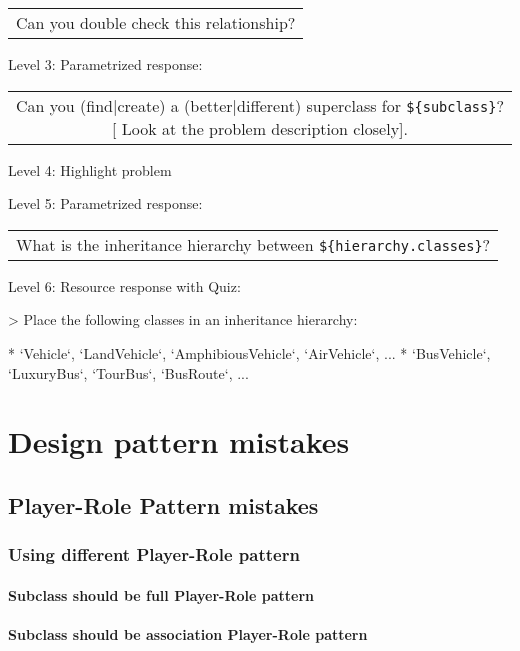 \begin{tabular}{|c}
Can you double check this relationship?
\end{tabular} \medskip

\noindent Level 3: Parametrized response: \medskip

\begin{tabular}{|c}
Can you (find|create) a (better|different) superclass for \verb|${subclass}|?[ Look at the problem description closely].
\end{tabular} \medskip

\noindent Level 4: Highlight problem \medskip

\noindent Level 5: Parametrized response: \medskip

\begin{tabular}{|c}
What is the inheritance hierarchy between \verb|${hierarchy.classes}|?
\end{tabular} \medskip

\noindent Level 6: Resource response with Quiz:

> Place the following classes in an inheritance hierarchy:

* `Vehicle`, `LandVehicle`, `AmphibiousVehicle`, `AirVehicle`, ...
* `BusVehicle`, `LuxuryBus`, `TourBus`, `BusRoute`, ...




\section{Design pattern mistakes}

\subsection{Player-Role Pattern mistakes}

\subsubsection{Using different Player-Role pattern}

\paragraph{Subclass should be full Player-Role pattern}


\paragraph{Subclass should be association Player-Role pattern}


